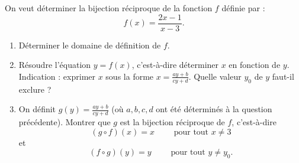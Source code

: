 \documentclass[11pt,class=report,crop=false]{standalone}
\begin{document}
\finexercice


\exercice{}
\enonce
On veut déterminer la bijection réciproque de la fonction $f$ définie par :
$$f(x) = \frac{2x-1}{x-3}.$$
\begin{enumerate}
    \item Déterminer le domaine de définition de $f$.
    
    \item Résoudre l'équation $y = f(x)$, c'est-à-dire déterminer $x$ en fonction de $y$.   
    Indication : exprimer $x$ sous la forme $x = \frac{ay+b}{cy+d}$.
    Quelle valeur $y_0$ de $y$ faut-il exclure ?
    
    \item On définit $g(y) = \frac{ay+b}{cy+d}$ (où $a,b,c,d$ ont été déterminés à la question précédente). Montrer que $g$ est la bijection réciproque de $f$, c'est-à-dire 
    $$(g \circ f)(x) = x  \qquad \text{ pour tout } x \neq 3$$
    et 
    $$(f \circ g)(y) = y  \qquad \text{ pour tout } y \neq y_0.$$
\end{enumerate} 
\finenonce


\finexercice
\end{document}

